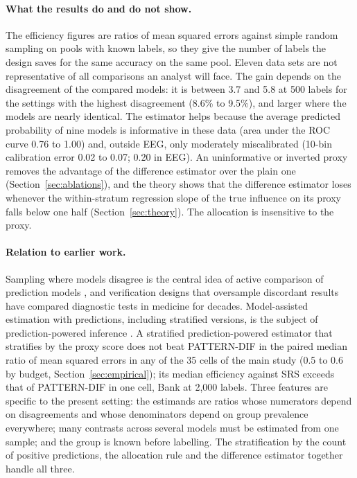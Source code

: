 \documentclass[pdflatex,sn-mathphys-num,iicol]{sn-jnl}
\theoremstyle{thmstyleone}
\theoremstyle{thmstyletwo}
\theoremstyle{thmstylethree}
\begin{document}
\paragraph{What the results do and do not show.} The efficiency figures are ratios of mean squared errors against simple random sampling on pools with known labels, so they give the number of labels the design saves for the same accuracy on the same pool. Eleven data sets are not representative of all comparisons an analyst will face. The gain depends on the disagreement of the compared models: it is between 3.7 and 5.8 at 500 labels for the settings with the highest disagreement (8.6\% to 9.5\%), and larger where the models are nearly identical. The estimator helps because the average predicted probability of nine models is informative in these data (area under the ROC curve 0.76 to 1.00) and, outside EEG, only moderately miscalibrated (10-bin calibration error 0.02 to 0.07; 0.20 in EEG). An uninformative or inverted proxy removes the advantage of the difference estimator over the plain one (Section~\ref{sec:ablations}), and the theory shows that the difference estimator loses whenever the within-stratum regression slope of the true influence on its proxy falls below one half (Section~\ref{sec:theory}). The allocation is insensitive to the proxy.

\paragraph{Relation to earlier work.} Sampling where models disagree is the central idea of active comparison of prediction models \citep{sawade2012active}, and verification designs that oversample discordant results have compared diagnostic tests in medicine for decades. Model-assisted estimation with predictions, including stratified versions, is the subject of prediction-powered inference \citep{angelopoulos2023ppi,fisch2024stratppi}. A stratified prediction-powered estimator that stratifies by the proxy score does not beat PATTERN-DIF in the paired median ratio of mean squared errors in any of the 35 cells of the main study (0.5 to 0.6 by budget, Section~\ref{sec:empirical}); its median efficiency against SRS exceeds that of PATTERN-DIF in one cell, Bank at 2,000 labels. Three features are specific to the present setting: the estimands are ratios whose numerators depend on disagreements and whose denominators depend on group prevalence everywhere; many contrasts across several models must be estimated from one sample; and the group is known before labelling. The stratification by the count of positive predictions, the allocation rule and the difference estimator together handle all three.
\end{document}
